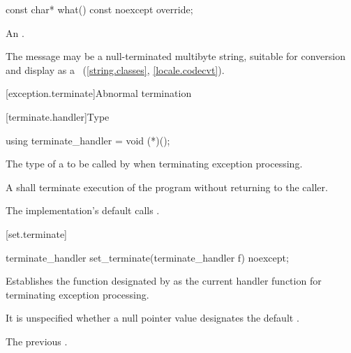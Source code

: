 %
\begin{itemdecl}
const char* what() const noexcept override;
\end{itemdecl}

\begin{itemdescr}
\pnum
\returns
An  \ntbs{}.

\pnum
\remarks
The message may be a null-terminated multibyte string,
suitable for conversion and display as a
~(\ref{string.classes}, \ref{locale.codecvt}).
\end{itemdescr}

[exception.terminate]{Abnormal termination}

[terminate.handler]{Type }

%
\begin{itemdecl}
using terminate_handler = void (*)();
\end{itemdecl}

\begin{itemdescr}
\pnum
The type of a
to be called by
%
when terminating exception processing.

\pnum
\required
A  shall
terminate execution of the program without returning to the caller.

\pnum
{}
The implementation's default  calls
.%
%
\end{itemdescr}

[set.terminate]{}

%
\begin{itemdecl}
terminate_handler set_terminate(terminate_handler f) noexcept;
\end{itemdecl}

\begin{itemdescr}
\pnum
\effects
Establishes the function designated by  as the current
handler function for terminating exception processing.

\pnum
\remarks It is unspecified whether a null pointer value designates the default
.

\pnum
\returns
The previous .
\end{itemdescr}

